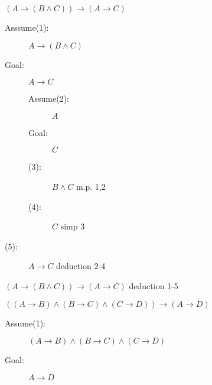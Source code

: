 \documentclass[12pt]{article}
\begin{document}
\begin{enumerate}
\begin{description}
\end{description}

\item $(A \rightarrow (B \wedge C)) \rightarrow (A \rightarrow C)$

\begin{description}
\item

\begin{description}

\item[Asssume(1):]  $A \rightarrow (B \wedge C)$

\item[Goal:]  $A \rightarrow C$

\begin{description}

\item[Assume(2):]  $A$

\item[Goal:]  $C$

\item[(3):]  $B \wedge C$ m.p. 1,2

\item[(4):]  $C$ simp 3

\end{description}

\item[(5):]  $A \rightarrow C$ deduction 2-4

\end{description}

\item[(6):]   $(A \rightarrow (B \wedge C)) \rightarrow (A \rightarrow C)$ deduction 1-5

\end{description}

\newpage

\item $((A \rightarrow B) \wedge (B \rightarrow C) \wedge (C \rightarrow D)) \rightarrow (A \rightarrow D)$

\begin{description}

\item[Assume(1):]  $(A \rightarrow B) \wedge (B \rightarrow C) \wedge (C \rightarrow D)$

\item[Goal:]  $A \rightarrow D$

\begin{description}

\item


\end{description}
\end{description}
\end{enumerate}
\end{document}
